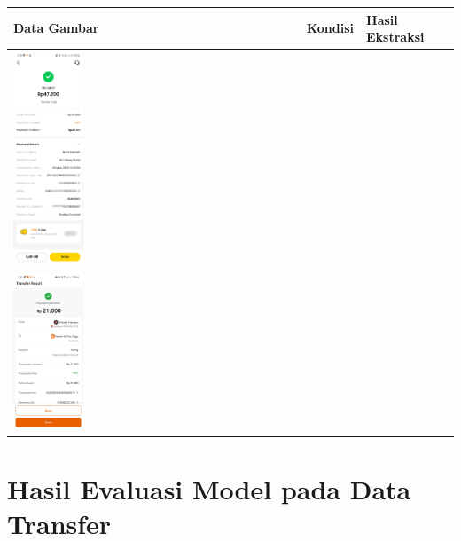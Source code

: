 \begin{table}[htbp]
    \centering
    \begin{tabularx}{\textwidth}{|p{4.2cm}|X|X|}
        \hline
        \textbf{Data Gambar} & \textbf{Kondisi} & \textbf{Hasil Ekstraksi} \\ \hline
        \includegraphics[width=0.25\textwidth]{images/contoh-data/qris-3.jpg} & 
         & 
         \\ \hline
        \includegraphics[width=0.25\textwidth]{images/contoh-data/qris-4.jpg} & 
         & 
         \\ \hline
    \end{tabularx}
\end{table}

\newpage

\section{Hasil Evaluasi Model pada Data Transfer}

